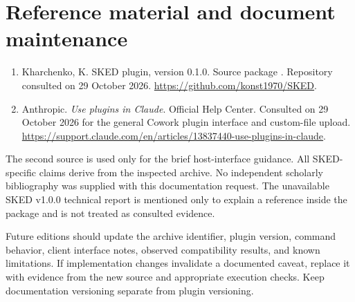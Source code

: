 \documentclass[12pt,a4paper]{article}
\newcommand{\code}[1]{\texttt{\detokenize{#1}}}
\begin{document}
\section{Reference material and document maintenance}
\begin{enumerate}
\item Kharchenko, K. SKED plugin, version 0.1.0. Source package \code{Sked-0.1.0-v1.zip}. Repository consulted on 29 October 2026. \url{https://github.com/konst1970/SKED}.
\item Anthropic. \emph{Use plugins in Claude}. Official Help Center. Consulted on 29 October 2026 for the general Cowork plugin interface and custom-file upload. \url{https://support.claude.com/en/articles/13837440-use-plugins-in-claude}.
\end{enumerate}
The second source is used only for the brief host-interface guidance. All SKED-specific claims derive from the inspected archive. No independent scholarly bibliography was supplied with this documentation request. The unavailable SKED v1.0.0 technical report is mentioned only to explain a reference inside the package and is not treated as consulted evidence.

Future editions should update the archive identifier, plugin version, command behavior, client interface notes, observed compatibility results, and known limitations. If implementation changes invalidate a documented caveat, replace it with evidence from the new source and appropriate execution checks. Keep documentation versioning separate from plugin versioning.
\end{document}
